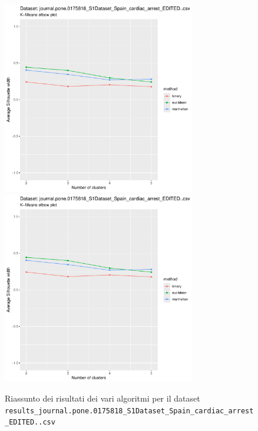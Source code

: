 \documentclass[12pt]{report}
\begin{document}
			\begin{figure}[h]
				\centering
				\includegraphics[width = 0.75\textwidth, height = 0.45\textheight, page = 9]{
					results/results_journal.pone.0175818_S1Dataset_Spain_cardiac_arrest_EDITED..csv.pdf
				}
				\includegraphics[width = 0.75\textwidth, height = 0.45\textheight, page = 10]{
					results/results_journal.pone.0175818_S1Dataset_Spain_cardiac_arrest_EDITED..csv.pdf
				}
				\caption{Riassunto dei risultati dei vari algoritmi per il dataset
				\texttt{results\_journal.pone.0175818\_S1Dataset\_Spain\_cardiac\_arrest\_EDITED..csv}}
				\label{fig:comp2}
			\end{figure}
\end{document}

